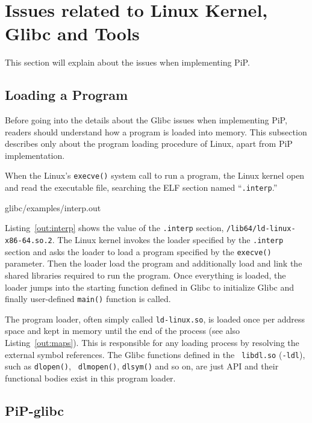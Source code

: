 
\section{Issues related to Linux Kernel, Glibc and Tools}

This section will explain about the issues when implementing PiP. 

\subsection{Loading a Program}

Before going into the details about the Glibc issues when implementing
PiP, readers should understand how a program is loaded into
memory. This subsection describes only about the program loading
procedure of Linux, apart from PiP implementation.

When the Linux's {\tt execve()} system call to run a program, the
Linux kernel open and read the executable file, searching the ELF
section named ``{\tt .interp}.''

 {glibc/examples/interp.out}

Listing~\ref{out:interp} shows the value of the {\tt .interp} section,
{\tt /lib64/ld-linux-x86-64.so.2}. The Linux kernel
invokes the loader specified by the {\tt .interp} section and asks the
loader to load a program specified by the {\tt execve()} parameter.
Then the loader load the program and additionally load and link the shared
libraries required to run the program. Once everything is loaded, the
loader jumps into the starting function defined in Glibc to initialize
Glibc and finally user-defined {\tt main()} function is called.

The program loader, often simply called {\tt ld-linux.so}, is loaded
once per address space and kept in memory until the end of the
process (see also Listing~\ref{out:maps}). This is responsible for any
loading process by resolving the 
external symbol references. The Glibc functions defined in the {\tt
  libdl.so} ({\tt -ldl}), such as {\tt dlopen()}, {\tt
  dlmopen()}, {\tt dlsym()} and so on, are just API 
and their functional bodies exist in this program loader.

\subsection{PiP-glibc}

